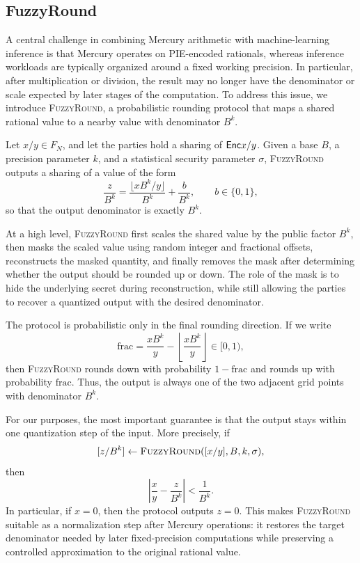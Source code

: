 \subsection{FuzzyRound} \label{sec:fuzzyround}

A central challenge in combining Mercury arithmetic with machine-learning
inference is that Mercury operates on PIE-encoded rationals, whereas
inference workloads are typically organized around a fixed working
precision. In particular, after multiplication or division, the result
may no longer have the denominator or scale expected by later stages of
the computation. To address this issue, we introduce
\textsc{FuzzyRound}, a probabilistic rounding protocol that maps a
shared rational value to a nearby value with denominator $B^k$.

Let $x/y \in F_N$, and let the parties hold a sharing of $\mathsf{Enc}{x/y}$.
Given a base $B$, a precision parameter $k$, and a statistical security
parameter $\sigma$, \textsc{FuzzyRound} outputs a sharing of a value of
the form
\[
\frac{z}{B^k}
=
\frac{\lfloor xB^k/y \rfloor}{B^k}
+
\frac{b}{B^k},
\qquad b \in \{0,1\},
\]
so that the output denominator is exactly $B^k$.

At a high level, \textsc{FuzzyRound} first scales the shared value by
the public factor $B^k$, then masks the scaled value using random
integer and fractional offsets, reconstructs the masked quantity, and
finally removes the mask after determining whether the output should be
rounded up or down. The role of the mask is to hide the underlying
secret during reconstruction, while still allowing the parties to
recover a quantized output with the desired denominator.

The protocol is probabilistic only in the final rounding direction. If
we write
\[
\mathrm{frac}
=
\frac{xB^k}{y}
-
\left\lfloor \frac{xB^k}{y} \right\rfloor
\in [0,1),
\]
then \textsc{FuzzyRound} rounds down with probability
$1-\mathrm{frac}$ and rounds up with probability $\mathrm{frac}$.
Thus, the output is always one of the two adjacent grid points with
denominator $B^k$.

For our purposes, the most important guarantee is that the output stays
within one quantization step of the input. More precisely, if
\[
[z/B^k] \leftarrow \textsc{FuzzyRound}([x/y], B, k, \sigma),
\]
then
\[
\left|
\frac{x}{y} - \frac{z}{B^k}
\right|
<
\frac{1}{B^k}.
\]
In particular, if $x=0$, then the protocol outputs $z=0$. This makes
\textsc{FuzzyRound} suitable as a normalization step after Mercury
operations: it restores the target denominator needed by later
fixed-precision computations while preserving a controlled
approximation to the original rational value.

